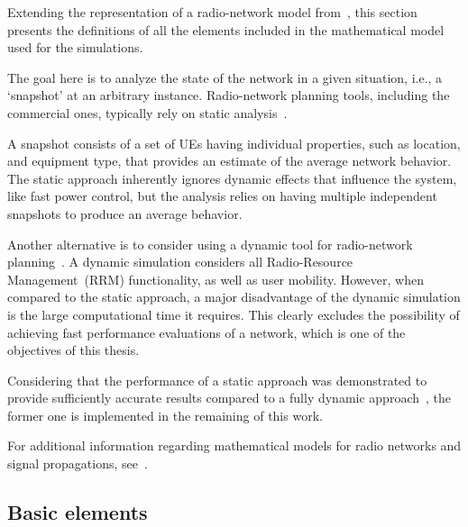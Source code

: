 Extending the representation of a radio-network model from~\cite{nawrocki2006understanding},
this section presents the definitions of all the elements included
in the mathematical model used for the simulations.

The goal here is to analyze the state of the network in a given situation,
i.e., a \textquoteleft{}snapshot\textquoteright{} at an arbitrary
instance. Radio-network planning tools, including the commercial ones,
typically rely on static analysis~\cite{Niemela-Performance_of_static_WCDMA_simulator:2005}.

A snapshot consists of a set of UEs having individual properties,
such as location, and equipment type, that provides an estimate of
the average network behavior. The static approach inherently ignores
dynamic effects that influence the system, like fast power control,
but the analysis relies on having multiple independent snapshots to
produce an average behavior.

Another alternative is to consider using a dynamic tool for radio-network
planning~\cite{Hamalainen-Advanced_WCDMA_radio_network_simulator:1999,Hoppe-Fast_planning_of_efficient_WCDMA_radio_networks:2001}.
A dynamic simulation considers all Radio-Resource Management~(RRM)
functionality, as well as user mobility. However, when compared to
the static approach, a major disadvantage of the dynamic simulation
is the large computational time it requires. This clearly excludes
the possibility of achieving fast performance evaluations of a network,
which is one of the objectives of this thesis.

Considering that the performance of a static approach was demonstrated
to provide sufficiently accurate results compared to a fully dynamic
approach~\cite{RadioNetworkPlanningAndOptimisationForUMTS,Laiho-Verification_of_WCDMA_network_planning_prediction_with_dynamic_simulations:2001},
the former one is implemented in the remaining of this work.

For additional information regarding mathematical models for radio
networks and signal propagations, see~\cite{RadioNetworkPlanningAndOptimisationForUMTS,Nawrocki_Understanding:2006,Stuber-Principles_of_mobile_communication:2011}.


\subsection{Basic elements}

